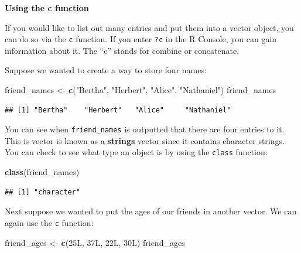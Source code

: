 \documentclass[]{tufte-book}
\newenvironment{Shaded}{\begin{snugshade}}{\end{snugshade}}
\newcommand{\KeywordTok}[1]{\textcolor[rgb]{0.13,0.29,0.53}{\textbf{{#1}}}}
\newcommand{\StringTok}[1]{\textcolor[rgb]{0.31,0.60,0.02}{{#1}}}
\newcommand{\NormalTok}[1]{{#1}}
\theoremstyle{definition}
\theoremstyle{definition}
\theoremstyle{remark}
\begin{document}
\vspace*{0.2in}

\noindent\textbf{Using the c function}\vspace*{0.1in}

If you would like to list out many entries and put them into a vector
object, you can do so via the \texttt{c} function. If you enter
\texttt{?c} in the R Console, you can gain information about it. The
``c'' stands for combine or concatenate.

Suppose we wanted to create a way to store four names:

\begin{Shaded}
\begin{Highlighting}[]
\NormalTok{friend_names <-}\StringTok{ }\KeywordTok{c}\NormalTok{(}\StringTok{"Bertha"}\NormalTok{, }\StringTok{"Herbert"}\NormalTok{, }\StringTok{"Alice"}\NormalTok{, }\StringTok{"Nathaniel"}\NormalTok{)}
\NormalTok{friend_names}
\end{Highlighting}
\end{Shaded}

\begin{verbatim}
## [1] "Bertha"    "Herbert"   "Alice"     "Nathaniel"
\end{verbatim}

You can see when \texttt{friend\_names} is outputted that there are four
entries to it. This is vector is known as a \textbf{strings} vector
since it contains character strings. You can check to see what type an
object is by using the \texttt{class} function:

\begin{Shaded}
\begin{Highlighting}[]
\KeywordTok{class}\NormalTok{(friend_names)}
\end{Highlighting}
\end{Shaded}

\begin{verbatim}
## [1] "character"
\end{verbatim}

Next suppose we wanted to put the ages of our friends in another vector.
We can again use the \texttt{c} function:

\begin{Shaded}
\begin{Highlighting}[]
\NormalTok{friend_ages <-}\StringTok{ }\KeywordTok{c}\NormalTok{(25L, 37L, 22L, 30L)}
\NormalTok{friend_ages}
\end{Highlighting}
\end{Shaded}
\end{document}
